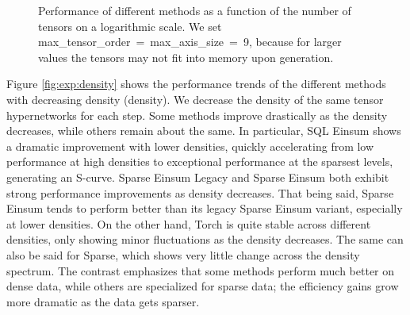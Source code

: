 \begin{figure}[H]
    \caption{Performance of different methods as a function of the number of tensors on a logarithmic scale. We set
        \mbox{max\_tensor\_order = max\_axis\_size = 9}, because for larger values the tensors may not
        fit into memory upon generation.}
    \label{fig:exp:num_tensors}
\end{figure}

\noindent
Figure \ref{fig:exp:density} shows the performance trends of the different methods with
decreasing density (density). We decrease the density of the same tensor hypernetworks for each step.
Some methods improve drastically as the density decreases, while others remain about the same. In
particular, SQL Einsum shows a dramatic improvement with lower densities, quickly accelerating from low
performance at high densities to exceptional performance at the sparsest levels, generating an
S-curve. Sparse Einsum Legacy and Sparse Einsum both exhibit strong performance improvements as
density decreases. That being said, Sparse Einsum tends to perform better than its legacy Sparse
Einsum variant, especially at lower densities. On the other hand, Torch is quite stable
across different densities, only showing minor fluctuations as the density decreases. The same can
also be said for Sparse, which shows very little change across the density spectrum. The contrast
emphasizes that some methods perform much better on dense data, while others are specialized
for sparse data; the efficiency gains grow more dramatic as the data gets sparser.

